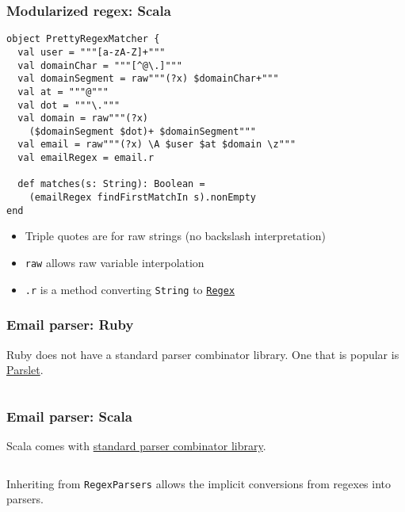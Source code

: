 \begin{frame}[fragile]
  \frametitle{Modularized regex: Scala}

  \begin{verbatim}
object PrettyRegexMatcher {
  val user = """[a-zA-Z]+"""
  val domainChar = """[^@\.]"""
  val domainSegment = raw"""(?x) $domainChar+"""
  val at = """@"""
  val dot = """\."""
  val domain = raw"""(?x)
    ($domainSegment $dot)+ $domainSegment"""
  val email = raw"""(?x) \A $user $at $domain \z"""
  val emailRegex = email.r

  def matches(s: String): Boolean =
    (emailRegex findFirstMatchIn s).nonEmpty
end
  \end{verbatim}

  \begin{itemize}
    \item Triple quotes are for raw strings (no backslash interpretation)
    \item \texttt{raw} allows raw variable interpolation
    \item \texttt{.r} is a method converting \texttt{String} to \href{http://www.scala-lang.org/api/current/index.html#scala.util.matching.Regex}{\texttt{Regex}}
  \end{itemize}
\end{frame}


\begin{frame}[fragile]
  \frametitle{Email parser: Ruby}

  Ruby does not have a standard parser combinator library. One that is popular is \href{http://kschiess.github.io/parslet/}{Parslet}.

  \inputminted{ruby}{ruby/lib/email_validator/parser.rb}
\end{frame}

\begin{frame}[fragile]
  \frametitle{Email parser: Scala}

  Scala comes with \href{http://www.scala-lang.org/api/current/index.html\#scala.util.parsing.combinator.Parsers}{standard parser combinator library}.

  \inputminted{scala}{extra/EmailParsers.scala}

  Inheriting from \texttt{RegexParsers} allows the implicit conversions from regexes into parsers.
\end{frame}



